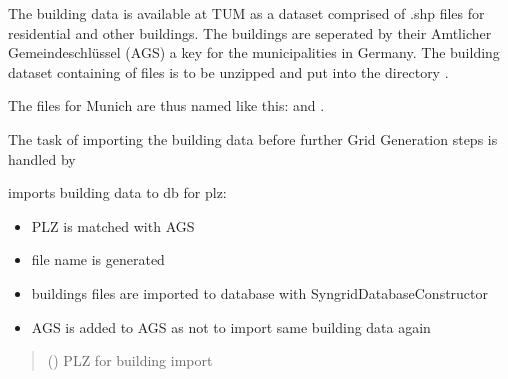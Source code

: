\documentclass[letterpaper,10pt,english]{sphinxmanual}
\begin{document}
\sphinxAtStartPar
The building data is available at TUM as a dataset comprised of .shp files for residential  and other
 buildings. The buildings are seperated by their Amtlicher Gemeindeschlüssel (AGS) a key for the
municipalities in Germany. The building dataset containing of files is to be unzipped and put into the directory
.

\sphinxAtStartPar
The files for Munich are thus named like this:  and .

\sphinxAtStartPar
The task of importing the building data before further Grid Generation steps is handled by

\begin{fulllineitems}
\label{\detokenize{grid_generation/explanation/building_data_import:raw_data.import_building_data.import_buildings_for_single_plz}}
\pysigstartsignatures
{}
\pysigstopsignatures
\sphinxAtStartPar
imports building data to db for plz:
\begin{itemize}
\item {} 
\sphinxAtStartPar
PLZ is matched with AGS

\item {} 
\sphinxAtStartPar
file name is generated

\item {} 
\sphinxAtStartPar
buildings files are imported to database with SyngridDatabaseConstructor

\item {} 
\sphinxAtStartPar
AGS is added to AGS as not to import same building data again

\end{itemize}
\begin{quote}\begin{description}
\sphinxAtStartPar
{} () \textendash{} PLZ for building import

\end{description}\end{quote}

\end{fulllineitems}
\end{document}
